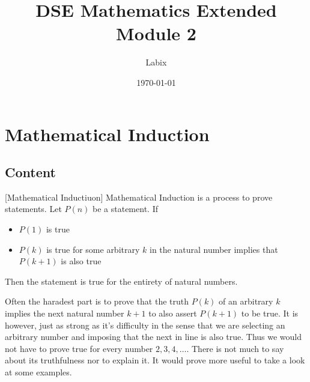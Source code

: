 \documentclass[a4paper]{article}
\title{DSE Mathematics Extended Module 2}
\author{Labix}
\date{\today}
\begin{document}
\maketitle
\begin{abstract}
\end{abstract}
\pagebreak
\tableofcontents
\pagebreak

\section{Mathematical Induction}
\subsection{Content}
\begin{defn}{}{}[Mathematical Inductiuon] Mathematical Induction is a process to prove statements. Let $P(n)$ be a statement. If 
\begin{itemize}
\item $P(1)$ is true
\item $P(k)$ is true for some arbitrary $k$ in the natural number implies that $P(k+1)$ is also true
\end{itemize} Then the statement is true for the entirety of natural numbers. 
\end{defn}
Often the haradest part is to prove that the truth $P(k)$ of an arbitrary $k$ implies the next natural number $k+1$ to also assert $P(k+1)$ to be true. It is however, just as strong as it's difficulty in the sense that we are selecting an arbitrary number and imposing that the next in line is also true. Thus we would not have to prove true for every number $2,3,4,\dots$. \linebreak\linebreak
There is not much to say about its truthfulness nor to explain it. It would prove more useful to take a look at some examples. 
\end{document}
